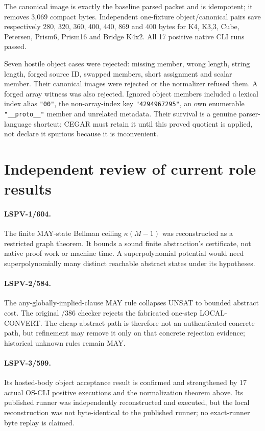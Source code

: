 \documentclass[11pt]{article}
\begin{document}
The canonical image is exactly the baseline parsed packet and is idempotent;
it removes 3,069 compact bytes.  Independent one-fixture object/canonical pairs
save respectively 280, 320, 360, 400, 440, 869 and 400 bytes for K4, K3,3,
Cube, Petersen, Prism6, Prism16 and Bridge K4x2.  All 17 positive native CLI
runs passed.

Seven hostile object cases were rejected: missing member, wrong length, string
length, forged source ID, swapped members, short assignment and scalar member.
Their canonical images were rejected or the normalizer refused them.  A forged
array witness was also rejected.  Ignored object members included a lexical
index alias \texttt{"00"}, the non-array-index key \texttt{"4294967295"}, an
own enumerable \texttt{"\_\_proto\_\_"} member and unrelated metadata.  Their
survival is a genuine parser-language shortcut; CEGAR must retain it until this
proved quotient is applied, not declare it spurious because it is inconvenient.

\section{Independent review of current role results}

\paragraph{LSPV-1/604.}
The finite MAY-state Bellman ceiling $\kappa(M-1)$ was reconstructed as a
restricted graph theorem.  It bounds a sound finite abstraction's certificate,
not native proof work or machine time.  A superpolynomial potential would need
superpolynomially many distinct reachable abstract states under its hypotheses.

\paragraph{LSPV-2/584.}
The any-globally-implied-clause MAY rule collapses UNSAT to bounded abstract
cost.  The original /386 checker rejects the fabricated one-step
LOCAL-CONVERT.  The cheap abstract path is therefore not an authenticated
concrete path, but refinement may remove it only on that concrete rejection
evidence; historical unknown rules remain MAY.

\paragraph{LSPV-3/599.}
Its hosted-body object acceptance result is confirmed and strengthened by 17
actual OS-CLI positive executions and the normalization theorem above.  Its
published runner was independently reconstructed and executed, but the local
reconstruction was not byte-identical to the published runner; no exact-runner
byte replay is claimed.
\end{document}
